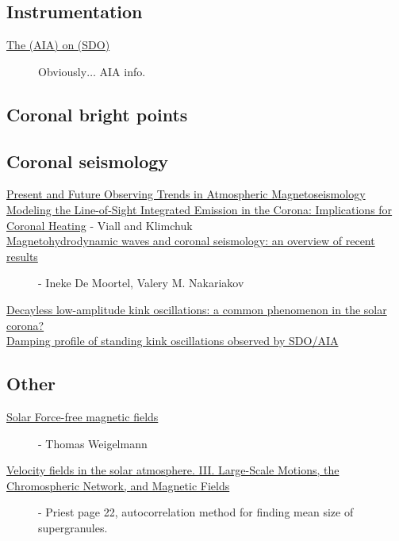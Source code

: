 \documentclass{article}
\begin{document}
\subsection{Instrumentation}
\begin{description}
    \item [\href{http://cdsads.u-strasbg.fr/abs/2012SoPh..275...17L}
            {The (AIA) on (SDO)}]
            Obviously$\ldots$ AIA info.
\end{description}
\subsection{Coronal bright points}
\subsection{Coronal seismology}
\begin{description}
    \item [\href{http://link.springer.com/article/10.1007\%2Fs11207-007-9029-z}
        {Present and Future Observing Trends in Atmospheric Magnetoseismology}]
    \item [\href{http://arxiv.org/abs/1304.5439}
        {Modeling the Line-of-Sight Integrated Emission in the Corona:
        Implications for Coronal Heating}
        - Viall and Klimchuk]
    \item [\href{http://rsta.royalsocietypublishing.org/content/370/1970/3193}
        {Magnetohydrodynamic waves and coronal seismology: an overview of recent results}]
        - Ineke De Moortel, Valery M. Nakariakov
    \item [\href{http://arxiv.org/abs/1509.05519}
        {Decayless low-amplitude kink oscillations: a common phenomenon in the solar corona?}]
    \item [\href{http://adsabs.harvard.edu/abs/2016A\%26A...585L...6P}
        {Damping profile of standing kink oscillations observed by SDO/AIA}]
\end{description}
\subsection{Other}
\begin{description}
    \item [\href{https://arxiv.org/abs/1208.4693}
        {Solar Force-free magnetic fields}]
        - Thomas Weigelmann
    \item [\href{http://cdsads.u-strasbg.fr/abs/1964ApJ...140.1120S}
        {Velocity fields in the solar atmosphere. III.
        Large-Scale Motions, the Chromospheric Network, and Magnetic Fields}]
        - Priest
        page 22, autocorrelation method for finding mean size of supergranules.
\end{description}
\end{document}
